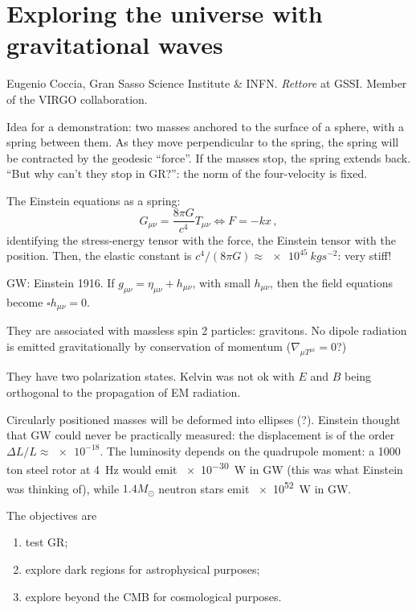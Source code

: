 \documentclass[main.tex]{subfiles}
\begin{document}
\section{Exploring the universe with gravitational waves}

Eugenio Coccia, Gran Sasso Science Institute \& INFN.
\emph{Rettore} at GSSI.
Member of the VIRGO collaboration.

Idea for a demonstration: two masses anchored to the surface of a sphere, with a spring between them. As they move perpendicular to the spring, the spring will be contracted by the geodesic ``force''.
If the masses stop, the spring extends back.
``But why can't they stop in GR?'': the norm of the four-velocity is fixed. 

The Einstein equations as a spring:
%
\begin{equation}
  G_{\mu \nu } = \frac{8 \pi G }{c^{4}} T_{\mu \nu } \iff
  F = -kx
\,,
\end{equation}
%
identifying the stress-energy tensor with the force, the Einstein tensor with the position. Then, the elastic constant is \(c^{4}/ (8 \pi G) \approx \SI{e45}{kg s^{-2}}\): very stiff! 

GW: Einstein 1916. If \(g_{\mu  \nu }= \eta_{ \mu \nu } + h_{\mu \nu }\), with small \(h_{\mu \nu }\), then the field equations become \(\square h_{\mu \nu }=0\).

They are associated with massless spin 2 particles: gravitons. No dipole radiation is emitted gravitationally by conservation of momentum (\(\nabla_{\mu T^{\mu i}}=0\)?)

They have two polarization states.
Kelvin was not ok with \(E\) and \(B\) being orthogonal to the propagation of EM radiation.

Circularly positioned masses will be deformed into ellipses (?).
Einstein thought that GW could never be practically measured: the displacement is of the order \(\Delta L / L \approx \num{e-18}\).
The luminosity depends on the quadrupole moment: a 1000 ton steel rotor at \SI{4}{Hz} would emit \SI{e-30}{W} in GW (this was what Einstein was thinking of), while \(1.4 M_{\odot}\) neutron stars emit \SI{e52}{W} in GW.

The objectives are 

\begin{enumerate}
    \item test GR;
    \item explore dark regions for astrophysical purposes;
    \item explore beyond the CMB for cosmological purposes.
\end{enumerate}
\end{document}
